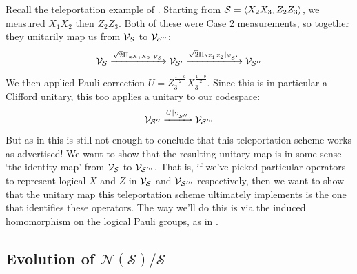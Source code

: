 \begin{example}\label{ex:teleportation_codespace_updates}
    Recall the teleportation example of .
    Starting from $\mathcal{S} = \langle X_2 X_3, Z_2 Z_3 \rangle$, we measured $X_1 X_2$ then $Z_2 Z_3$.
    Both of these were \hyperref[thm:stabilizer_group_update_measurement:case2]{Case 2} measurements, so together they unitarily map us from $\mathcal{V}_{\mathcal{S}}$ to $\mathcal{V}_{\mathcal{S}''}$:
    \begin{equation}
        \mathcal{V}_{\mathcal{S}}
        \xrightarrow{\sqrt{2}\Pi_{a X_1 X_2}|_{\mathcal{V}_{\mathcal{S}}}}
        \mathcal{V}_{\mathcal{S}'}
        \xrightarrow{\sqrt{2}\Pi_{b Z_1 Z_2}|_{\mathcal{V}_{\mathcal{S}'}}}
        \mathcal{V}_{\mathcal{S}''}
    \end{equation}
    We then applied Pauli correction $U = Z_3^{\frac{1 - a}{2}} X_3^{\frac{1 - b}{2}}$.
    Since this is in particular a Clifford unitary, this too applies a unitary to our codespace:
    \begin{equation}
        \mathcal{V}_{\mathcal{S}''}
        \xrightarrow{U|_{\mathcal{V}_{\mathcal{S}''}}}
        \mathcal{V}_{\mathcal{S}'''}
    \end{equation}
    But as in  this is still not enough to conclude that this teleportation scheme works as advertised!
    We want to show that the resulting unitary map is in some sense `the identity map' from $\mathcal{V}_{\mathcal{S}}$ to $\mathcal{V}_{\mathcal{S}'''}$.
    That is, if we've picked particular operators to represent logical $X$ and $Z$ in $\mathcal{V}_{\mathcal{S}}$ and $\mathcal{V}_{\mathcal{S}'''}$ respectively, then we want to show that the unitary map this teleportation scheme ultimately implements is the one that identifies these operators.
    The way we'll do this is via the induced homomorphism on the logical Pauli groups, as in .
\end{example}

\subsection{Evolution of $\mathcal{N}(\mathcal{S})/\mathcal{S}$}\label{subsec:evolution_of_logical_pauli_group}

